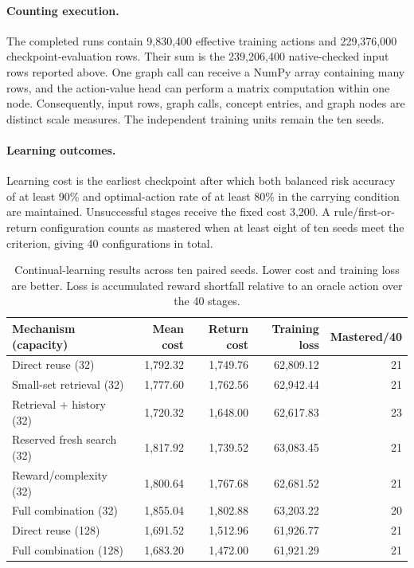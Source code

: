 \paragraph{Counting execution.}
The completed runs contain 9,830,400 effective training actions and 229,376,000
checkpoint-evaluation rows. Their sum is the 239,206,400 native-checked input
rows reported above. One graph call can receive a NumPy array containing many
rows, and the action-value head can perform a matrix computation within one
node. Consequently, input rows, graph calls, concept entries, and graph nodes
are distinct scale measures. The independent training units remain the ten
seeds.

\paragraph{Learning outcomes.}
Learning cost is the earliest checkpoint after which both balanced risk accuracy
of at least 90\% and optimal-action rate of at least 80\% in the carrying
condition are maintained. Unsuccessful stages receive the fixed cost 3,200.
A rule/first-or-return configuration counts as mastered when at least eight
of ten seeds meet the criterion, giving 40 configurations in total.

\begin{table}[tb]
\centering
\small
\caption{Continual-learning results across ten paired seeds. Lower cost and
training loss are better. Loss is accumulated reward shortfall relative to an
oracle action over the 40 stages.}
\label{tab:revision_large_results}
\begin{tabular}{lrrrr}
\toprule
Mechanism (capacity) & Mean cost & Return cost & Training loss & Mastered/40 \\
\midrule
Direct reuse (32) & 1,792.32 & 1,749.76 & 62,809.12 & 21 \\
Small-set retrieval (32) & 1,777.60 & 1,762.56 & 62,942.44 & 21 \\
Retrieval + history (32) & 1,720.32 & 1,648.00 & 62,617.83 & 23 \\
Reserved fresh search (32) & 1,817.92 & 1,739.52 & 63,083.45 & 21 \\
Reward/complexity (32) & 1,800.64 & 1,767.68 & 62,681.52 & 21 \\
Full combination (32) & 1,855.04 & 1,802.88 & 63,203.22 & 20 \\
Direct reuse (128) & 1,691.52 & 1,512.96 & 61,926.77 & 21 \\
Full combination (128) & 1,683.20 & 1,472.00 & 61,921.29 & 21 \\
\bottomrule
\end{tabular}
\end{table}

